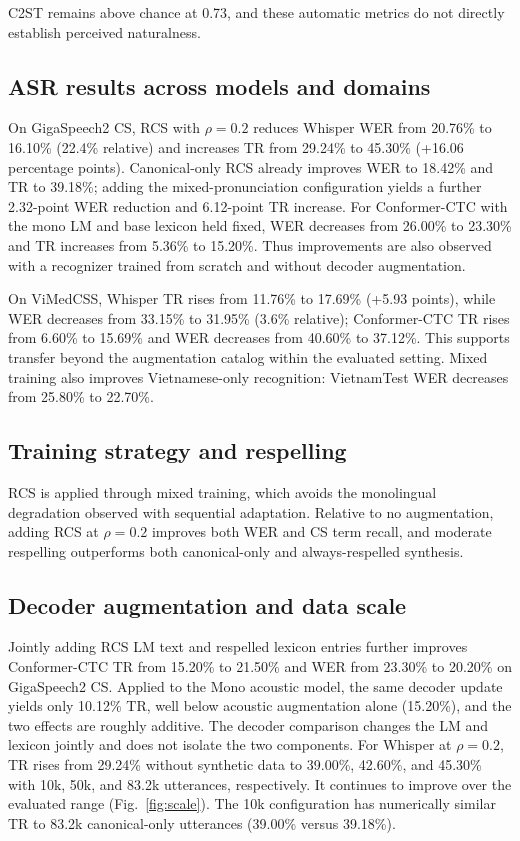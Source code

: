 \documentclass[letterpaper]{article}
\begin{document}
C2ST remains above chance at 0.73, and these automatic
metrics do not directly establish perceived naturalness.

\subsection{ASR results across models and domains}
On GigaSpeech2 CS, RCS with $\rho=0.2$ reduces Whisper WER
from 20.76\% to 16.10\% (22.4\% relative) and increases TR
from 29.24\% to 45.30\% (+16.06 percentage points).
Canonical-only RCS already improves WER to 18.42\% and TR
to 39.18\%; adding the mixed-pronunciation configuration
yields a further 2.32-point WER reduction and 6.12-point
TR increase. For Conformer-CTC with the mono LM and base lexicon held fixed, WER
decreases from 26.00\% to 23.30\% and TR increases from 5.36\% to 15.20\%. Thus improvements
are also observed with a recognizer trained from scratch
and without decoder augmentation.

On ViMedCSS, Whisper TR rises from 11.76\% to 17.69\%
(+5.93 points), while WER decreases from 33.15\% to
31.95\% (3.6\% relative); Conformer-CTC TR rises from
6.60\% to 15.69\% and WER decreases from 40.60\% to
37.12\%. This supports transfer beyond the augmentation
catalog within the evaluated setting.
Mixed training also improves Vietnamese-only recognition:
VietnamTest WER decreases from 25.80\% to 22.70\%.

\subsection{Training strategy and respelling}
RCS is applied through mixed training, which avoids the
monolingual degradation observed with sequential adaptation.
Relative to no augmentation, adding RCS at $\rho=0.2$ improves
both WER and CS term recall, and moderate respelling
outperforms both canonical-only and always-respelled
synthesis.

\subsection{Decoder augmentation and data scale}
Jointly adding RCS LM text and respelled lexicon entries
further improves Conformer-CTC TR from 15.20\% to 21.50\%
and WER from 23.30\% to 20.20\% on GigaSpeech2 CS.
Applied to the Mono acoustic model, the same decoder update
yields only 10.12\% TR, well below acoustic augmentation alone
(15.20\%), and the two effects are roughly additive.
The decoder comparison changes the LM and lexicon jointly
and does not isolate the two components.
For Whisper at $\rho=0.2$, TR rises from 29.24\%
without synthetic data to 39.00\%, 42.60\%, and 45.30\%
with 10k, 50k, and 83.2k utterances, respectively.
It continues to improve over the evaluated range
(Fig.~\ref{fig:scale}).
The 10k configuration has numerically similar TR to
83.2k canonical-only utterances (39.00\% versus 39.18\%).
\end{document}
